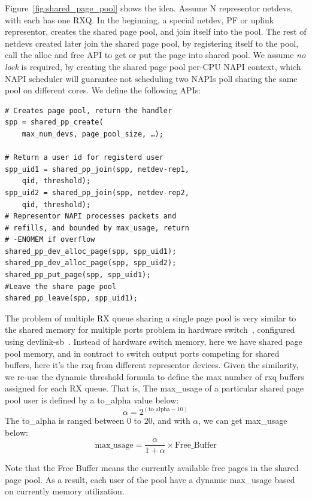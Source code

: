 \documentclass[letterpaper]{article}
\begin{document}
Figure~\ref{fig:shared_page_pool} shows the idea.
Assume N representor netdevs, with each has one RXQ. In the beginning,
a special netdev, PF or uplink representor, creates the shared page pool,
and join itself into the pool. The rest of netdevs created later join the shared page pool,
by registering itself to the pool, call the alloc and free API to
get or put the page into shared pool. We assume \emph{no lock} is required,
by creating the shared page pool per-CPU NAPI context, which NAPI scheduler
will guarantee not scheduling two NAPIs poll sharing the same pool on
different cores. We define the following APIs:
\begin{verbatim}
# Creates page pool, return the handler
spp = shared_pp_create(
    max_num_devs, page_pool_size, …);

# Return a user id for registerd user
spp_uid1 = shared_pp_join(spp, netdev-rep1,
    qid, threshold);
spp_uid2 = shared_pp_join(spp, netdev-rep2,
    qid, threshold);
# Representor NAPI processes packets and
# refills, and bounded by max_usage, return
# -ENOMEM if overflow
shared_pp_dev_alloc_page(spp, spp_uid1);
shared_pp_dev_alloc_page(spp, spp_uid2);
shared_pp_put_page(spp, spp_uid1);
#Leave the share page pool
shared_pp_leave(spp, spp_uid1); 
\end{verbatim}

The problem of multiple RX queue sharing a single page pool is
very similar to the shared memory for multiple ports problem in
hardware switch~\cite{}, configured using devlink-sb~\cite{devlinksb}.
Instead of hardware switch memory, here we have shared page pool memory,
and in contract to switch output ports competing for shared buffers,
here it's the rxq from different representor devices.
Given the similarity, we re-use the dynamic threshold formula to define
the max number of rxq buffers assigned for each RX queue. That is,
The max\_usage of a particular shared page pool user is
defined by a to\_alpha value below:
\begin{equation}
\alpha = 2^{(\text{to\_alpha} - 10)}
\end{equation}
The to\_alpha is ranged between 0 to 20, and with $\alpha$, we can get
max\_usage below:
\begin{equation}
\text{max\_usage} = \frac{\alpha}{1 + \alpha} \times \text{Free\_Buffer}
\end{equation}

Note that the Free Buffer means the currently available free pages
in the shared page pool. As a result, each user of the pool have a
dynamic max\_usage based on currently memory utilization.
\end{document}
